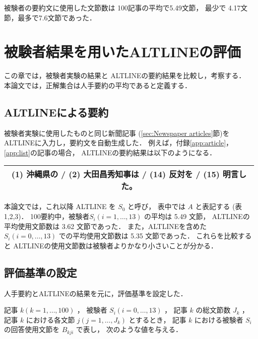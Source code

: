 被験者の要約文に使用した文節数は 100記事の平均で5.49文節，
最少で 4.17文節，最多で7.6文節であった．

\section{被験者結果を用いたALTLINEの評価}
\label{sec:human vs ALTLINE}

この章では，被験者実験の結果と ALTLINEの要約結果を比較し，考察する．
本論文では，正解集合は人手要約の平均であると定義する．

\subsection{ALTLINEによる要約}
\label{sec:ALTLINE's summarization}

被験者実験に使用したものと同じ新聞記事
(\ref{sec:Newspaper articles}節)を
ALTLINEに入力し，要約文を自動生成した．
例えば，付録\ref{app:article}，\ref{app:list}の記事の場合，
ALTLINEの要約結果は以下のようになる．

\vspace{3mm}
\begin{center}
\begin{tabular}{c}
\hline 
\tiny{(1)} \normalsize{沖縄県の / }
\tiny{(2)} \normalsize{大田昌秀知事は / }
\tiny{(14)} \normalsize{反対を /} 
\tiny{(15)} \normalsize{明言した。 } \\
\hline
\end{tabular}
\end{center}
\vspace{3mm}

本論文では，これ以降 ALTLINE を $S_{0}$ と呼び，
表中では $A$ と表記する
(表1,2,3)．
100要約中，被験者$S_{i}(i=1,\ldots,13)$ の平均は 5.49 文節，
ALTLINEの平均使用文節数は 3.62 文節であった．
また，ALTLINEを含めた
$S_{i}(i=0,\ldots,13)$ での平均使用文節数は 5.35 文節であった．
これらを比較すると ALTLINEの使用文節数は被験者よりかなり小さいことが分かる．


\subsection{評価基準の設定}
\label{Evaluation criterion design}

人手要約とALTLINEの結果を元に，評価基準を設定した．

記事 $k (k=1,\ldots,100)$ ，
被験者 $S_{i} (i=0,\ldots,13)$ ，
記事 $k$ の総文節数 $J_{k}$ ，
記事 $k$ における各文節 $j (j=1,\ldots,J_{k})$   とするとき，
記事 $k$ における被験者 $S_{i}$ の回答使用文節を $B_{kji}$ で表し，
次のような値を与える．

